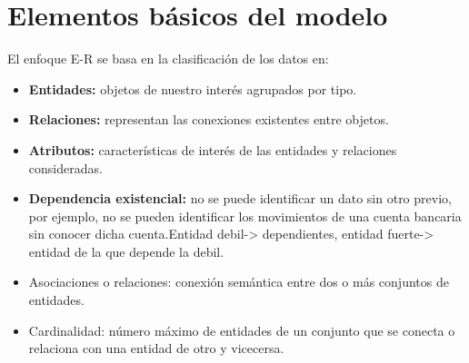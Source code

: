 \documentclass[a4paper,10pt]{article}
\begin{document}
\section{Elementos básicos del modelo}
El enfoque E-R se basa en la clasificación de los datos en:

\begin{itemize}
\item \textbf{Entidades:} objetos de nuestro interés agrupados por tipo.

\item \textbf{Relaciones:} representan las conexiones existentes entre objetos.

\item \textbf{Atributos:} características de interés de las entidades y relaciones consideradas.

\item \textbf{Dependencia existencial:} no se puede identificar un dato sin otro previo, por ejemplo, no se pueden identificar los movimientos de una cuenta bancaria sin conocer dicha cuenta.Entidad debil-> dependientes, entidad fuerte-> entidad de la que depende la debil.

\item Asociaciones o relaciones: conexión semántica entre dos o más conjuntos de entidades.

\item Cardinalidad: número máximo de entidades de un conjunto que se conecta o relaciona con una entidad de otro y vicecersa.
\end{itemize}
\end{document}
